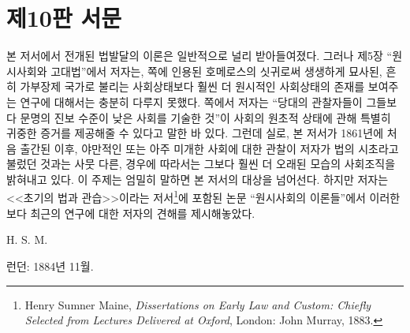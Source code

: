 \chapter*{제10판 서문}

본 저서에서 전개된 법발달의 이론은 일반적으로 널리 받아들여졌다.
그러나
제5장 ``원시사회와 고대법''에서
저자는,
\pageref{cyclops}쪽에 인용된
호메로스의 싯귀로써 생생하게 묘사된,
흔히 가부장제 국가로 불리는
사회상태보다
훨씬 더 원시적인 사회상태의 존재를 보여주는 연구에 대해서는
충분히 다루지 못했다.
\pageref{contemporary}쪽에서 저자는
``당대의 관찰자들이 그들보다 문명의 진보 수준이 낮은 사회를 기술한 것''이
사회의 원초적 상태에 관해 특별히 귀중한 증거를 제공해줄 수 있다고
말한 바 있다.
그런데 실로,
본 저서가 1861년에 처음 출간된 이후,
야만적인 또는 아주 미개한 사회에 대한 관찰이
저자가 법의 시초라고 불렀던 것과는 사뭇 다른,
경우에 따라서는 그보다 훨씬 더 오래된
모습의 사회조직을 밝혀내고 있다.
이 주제는 엄밀히 말하면 본 저서의 대상을 넘어선다.
하지만
저자는
<<초기의 법과 관습>>이라는
저서\footnote{%
  \latinmarks
  Henry Sumner Maine,
  \textit{Dissertations on Early Law and Custom:
  Chiefly Selected from Lectures Delivered at Oxford},
  London: John Murray, 1883.
}에
포함된 논문
``원시사회의 이론들''에서
이러한 보다 최근의 연구에 대한 저자의 견해를 제시해놓았다.

\begin{flushright}
H. S. M.
\end{flushright}

\begin{footnotesize}
런던: 1884년 11월.
\end{footnotesize}

